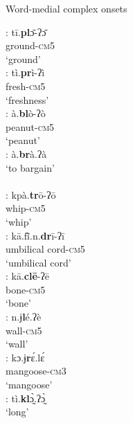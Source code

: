 \documentclass[output=paper]{langscibook}
\begin{document}
 \begin{exe}\setlength{\multicolsep}{0pt}
     \ex Word-medial complex onsets \label{ex:traore:wordMedialComplexOnsets:15}
    \begin{multicols}{2}
     \begin{xlisti}
        \ex \glll [pl]:    tī.\textbf{pl}ɔ̄-ʔɔ̄ \\
            {}  ground-\textsc{cm}5\\
            {} `ground'\\
        \ex \glll [pr]:     tì.\textbf{pr}ì-ʔì\\
            {}  fresh-\textsc{cm}5\\
            {} `freshness'\\
        \ex \glll [bl]:    à.\textbf{bl}ò-ʔò\\
            {}      peanut-\textsc{cm}5\\
            {} `peanut'\\
        \ex  \glll [br]:    à.\textbf{br}à.ʔà\\
            {}  {`to bargain'}\\
            {}  {}\\
        \ex \glll [tr]:    kpà.\textbf{tr}ō-ʔō\\
            {}   whip-\textsc{cm}5\\
            {}  `whip'\\
        \ex \glll [dr]: kā.fĩ̄.n.\textbf{dr}ī-ʔī\\
            {}  {umbilical cord-\textsc{cm}5}\\
            {}  {`umbilical cord'}\\
        \ex \glll  [cl]:   kā.\textbf{clē}{}-ʔē \\
            {}  bone-\textsc{cm}5\\
            {} `bone'\\
        \ex \glll [ɉl]:     n.ɉ\textbf{l}é.ʔè\\
            {}   wall-\textsc{cm}5\\
            {}  `wall'\\
        \ex  \glll [ɉr]:      kɔ.ɉ\textbf{r}ɛ́.lɛ́ \\
            {}  mangoose-\textsc{cm}3\\
            {}  `mangoose'\\
        \ex \glll [kl]:    tì.\textbf{kl}ɔ̰̀.ʔɔ̰̀\\
            {}  `long'\\
            {}  {}\\

\end{xlisti}
\end{multicols}
\end{exe}
\end{document}
